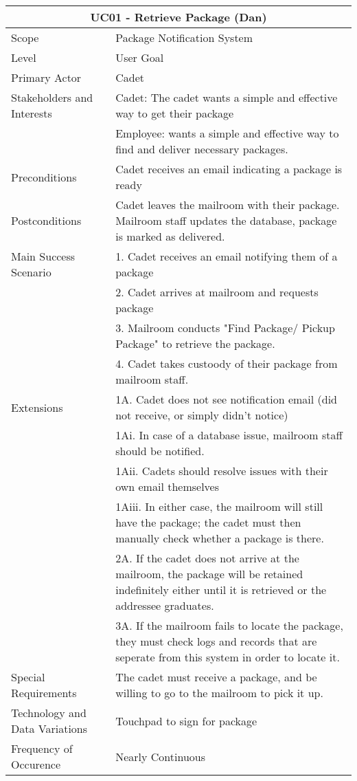\documentclass[11pt]{article}
\begin{document}
\newpage
\begin{table}[tbp]
\vskip-1.0cm\hskip-3.0cm\begin{tabularx}{1.5\textwidth}{|X|X|}
\hline\multicolumn{2}{|c|}{UC01 - Retrieve Package (Dan)} \\
\hline Scope & Package Notification System \\
\hline Level & User Goal \\
\hline Primary Actor & Cadet \\
\hline Stakeholders and Interests & Cadet: The cadet wants a simple and effective way to get their package \\ & Employee: wants a simple and effective way to find and deliver necessary packages. \\
\hline Preconditions & Cadet receives an email indicating a package is ready \\
\hline Postconditions & Cadet leaves the mailroom with their package. Mailroom staff updates the database, package is marked as delivered. \\
\hline Main Success Scenario & 1. Cadet receives an email notifying them of a package \\
& 2. Cadet arrives at mailroom and requests package \\
& 3. Mailroom conducts "Find Package/ Pickup Package" to retrieve the package. \\
& 4. Cadet takes custoody of their package from mailroom staff. \\
\hline Extensions & 1A. Cadet does not see notification email (did not receive, or simply didn't notice) \\
& 1Ai. In case of a database issue, mailroom staff should be notified.  \\
& 1Aii. Cadets should resolve issues with their own email themselves \\
& 1Aiii. In either case, the mailroom will still have the package; the cadet must then manually check whether a package is there. \\
& 2A. If the cadet does not arrive at the mailroom, the package will be retained indefinitely either until it is retrieved or the addressee graduates. \\
& 3A. If the mailroom fails to locate the package, they must check logs and records that are seperate from this system in order to locate it. \\
\hline Special Requirements & The cadet must receive a package, and be willing to go to the mailroom to pick it up. \\
\hline Technology and Data Variations & Touchpad to sign for package \\
\hline Frequency of Occurence & Nearly Continuous \\
\hline
\end{tabularx}\end{table}
\end{document}
